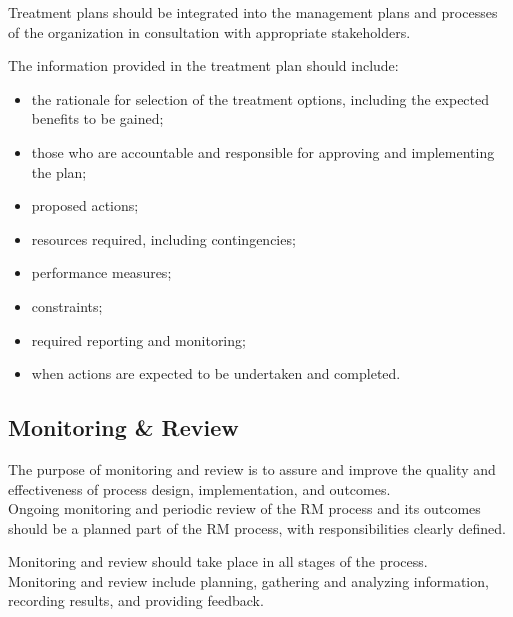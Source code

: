 \documentclass[letterpaper,10pt,english]{jupyterBook}
\begin{document}
\sphinxAtStartPar
Treatment plans should be integrated into the management plans and processes of the organization in consultation with appropriate stakeholders.

\sphinxAtStartPar
The information provided in the treatment plan should include:
\begin{itemize}
\item {} 
\sphinxAtStartPar
the rationale for selection of the treatment options, including the expected benefits to be gained;

\item {} 
\sphinxAtStartPar
those who are accountable and responsible for approving and implementing the plan;

\item {} 
\sphinxAtStartPar
proposed actions;

\item {} 
\sphinxAtStartPar
resources required, including contingencies;

\item {} 
\sphinxAtStartPar
performance measures;

\item {} 
\sphinxAtStartPar
constraints;

\item {} 
\sphinxAtStartPar
required reporting and monitoring;

\item {} 
\sphinxAtStartPar
when actions are expected to be undertaken and completed.

\end{itemize}


\subsection{Monitoring \& Review}
\label{\detokenize{PM/rm:monitoring-review}}
\sphinxAtStartPar
The purpose of monitoring and review is to assure and improve the quality and effectiveness of process design, implementation, and outcomes. \\
Ongoing monitoring and periodic review of the RM process and its outcomes should be a planned part of the RM process, with responsibilities clearly defined.

\sphinxAtStartPar
Monitoring and review should take place in all stages of the process. \\
Monitoring and review include planning, gathering and analyzing information, recording results, and providing feedback.
\end{document}
